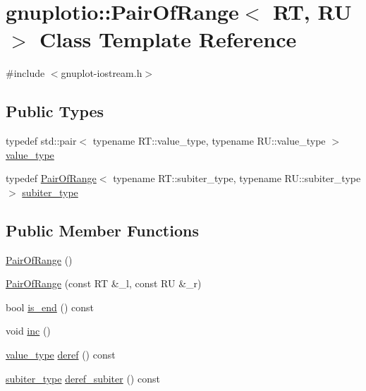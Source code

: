 \hypertarget{classgnuplotio_1_1_pair_of_range}{}\section{gnuplotio\+:\+:Pair\+Of\+Range$<$ RT, RU $>$ Class Template Reference}
\label{classgnuplotio_1_1_pair_of_range}


{\ttfamily \#include $<$gnuplot-\/iostream.\+h$>$}

\subsection*{Public Types}
\begin{DoxyCompactItemize}
\item 
typedef std\+::pair$<$ typename R\+T\+::value\+\_\+type, typename R\+U\+::value\+\_\+type $>$ \hyperlink{classgnuplotio_1_1_pair_of_range_a0cc8b0cc4d9c3377c43843ed9a658eeb}{value\+\_\+type}
\item 
typedef \hyperlink{classgnuplotio_1_1_pair_of_range}{Pair\+Of\+Range}$<$ typename R\+T\+::subiter\+\_\+type, typename R\+U\+::subiter\+\_\+type $>$ \hyperlink{classgnuplotio_1_1_pair_of_range_a6a7bf8a5dd4ca0563eb71b1156d6cd9f}{subiter\+\_\+type}
\end{DoxyCompactItemize}
\subsection*{Public Member Functions}
\begin{DoxyCompactItemize}
\item 
\hyperlink{classgnuplotio_1_1_pair_of_range_a94b7cbc319a066dc9744ea1407163fb0}{Pair\+Of\+Range} ()
\item 
\hyperlink{classgnuplotio_1_1_pair_of_range_a15055ed8b1c0af8febf20f5a24d7dc05}{Pair\+Of\+Range} (const RT \&\+\_\+l, const RU \&\+\_\+r)
\item 
bool \hyperlink{classgnuplotio_1_1_pair_of_range_af9c705aa88e6366910e279674961ff79}{is\+\_\+end} () const
\item 
void \hyperlink{classgnuplotio_1_1_pair_of_range_adbb8ab0fb9f7245262041dd20444b96a}{inc} ()
\item 
\hyperlink{classgnuplotio_1_1_pair_of_range_a0cc8b0cc4d9c3377c43843ed9a658eeb}{value\+\_\+type} \hyperlink{classgnuplotio_1_1_pair_of_range_af4ed81400c73c45c9aa1e6d0ad14579f}{deref} () const
\item 
\hyperlink{classgnuplotio_1_1_pair_of_range_a6a7bf8a5dd4ca0563eb71b1156d6cd9f}{subiter\+\_\+type} \hyperlink{classgnuplotio_1_1_pair_of_range_aaab5fb2c7de99651a2c7eef7685545fd}{deref\+\_\+subiter} () const
\end{DoxyCompactItemize}
